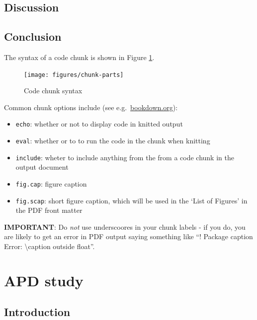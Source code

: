 \documentclass[a4paper, twoside]{templates/ociamthesis}
\providecommand{\tightlist}{%
  \setlength{\itemsep}{0pt}\setlength{\parskip}{0pt}}
\begin{document}
\hypertarget{discussion-3}{%
\section{Discussion}\label{discussion-3}}

\hypertarget{conclusion-1}{%
\section{Conclusion}\label{conclusion-1}}

The syntax of a code chunk is shown in Figure \ref{fig:chunk-parts}.

\begin{figure}
\texttt{[image: figures/chunk-parts]} \caption{Code chunk syntax}\label{fig:chunk-parts}
\end{figure}

Common chunk options include (see e.g.~\href{https://bookdown.org/yihui/rmarkdown/r-code.html}{bookdown.org}):

\begin{itemize}
\tightlist
\item
  \texttt{echo}: whether or not to display code in knitted output
\item
  \texttt{eval}: whether or to to run the code in the chunk when knitting
\item
  \texttt{include}: wheter to include anything from the from a code chunk in the output document
\item
  \texttt{fig.cap}: figure caption
\item
  \texttt{fig.scap}: short figure caption, which will be used in the `List of Figures' in the PDF front matter
\end{itemize}

\textbf{IMPORTANT}: Do \emph{not} use underscoores in your chunk labels - if you do, you are likely to get an error in PDF output saying something like ``! Package caption Error: \textbackslash caption outside float''.

\hypertarget{APD-study}{%
\chapter{APD study}\label{APD-study}}


\minitoc 

\hypertarget{introduction-4}{%
\section{Introduction}\label{introduction-4}}
\end{document}

